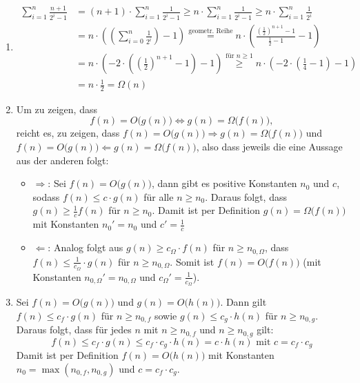 \documentclass[11pt,a4paper]{article}
\begin{document}
\begin{loesung}
\begin{enumerate}
    \item
    \begin{align}
        \sum\limits_{i=1}^{n} \frac{n + 1}{2^i - 1} &= (n+1)\cdot\sum\limits_{i=1}^{n} \frac{1}{2^i - 1} \geq
        n\cdot\sum\limits_{i=1}^{n} \frac{1}{2^i - 1} 
        \geq n \cdot \sum\limits_{i=1}^{n} \frac{1}{2^i} \\
        &= n \cdot \left(\left(\sum\limits_{i=0}^{n} \frac{1}{2^i}\right) - 1\right)
        \overset{\text{geometr. Reihe}}{=}
        n \cdot  \left(\frac{\left(\frac{1}{2}\right)^{n+1} - 1}{\frac{1}{2} - 1} - 1\right) \\
        &=n \cdot  \left(-2 \cdot \left(\left(\frac{1}{2}\right)^{n + 1} - 1\right) - 1\right)
        \overset{\text{für }n \geq 1}{\geq} n \cdot  \left(-2 \cdot \left(\frac{1}{4} - 1\right) - 1\right) \\
        &= n \cdot \frac{1}{2}= \Omega(n)
    \end{align}

    \item
    Um zu zeigen, dass 
    \begin{equation}
     f(n) = O\big(g(n)\big) \Leftrightarrow g(n) = \Omega\big(f(n)\big),
    \end{equation}
    reicht es, zu zeigen, dass $f(n) = O\big(g(n)\big) \Rightarrow g(n) = \Omega\big(f(n)\big)$ und $f(n) = O\big(g(n)\big) \Leftarrow g(n) = \Omega\big(f(n)\big)$, also dass jeweils die eine Aussage aus der anderen folgt:
    \begin{itemize}
        \item $\Rightarrow$: Sei $f(n) = O\big(g(n)\big)$, dann gibt es positive Konstanten $n_0$ und $c$, sodass $f(n) \leq c \cdot g(n)$ für alle $n \geq n_0$.
        Daraus folgt, dass $g(n) \geq \frac{1}{c} f(n)$ für $n \geq n_0$.
        Damit ist per Definition $g(n) = \Omega\big(f(n)\big)$ mit Konstanten $n_0' = n_0$ und $c' = \frac{1}{c}$
        \item $\Leftarrow$: Analog folgt aus $g(n) \geq c_\Omega \cdot f(n)$ für $n \geq n_{0,\Omega}$, dass $f(n) \leq \frac{1}{c_\Omega} \cdot g(n)$ für $n \geq n_{0,\Omega}$.
        Somit ist $f(n) = O\big(f(n)\big)$ (mit Konstanten $n_{0,\Omega}' = n_{0,\Omega}$ und $c_{\Omega}' = \frac{1}{c_\Omega}$).
    \end{itemize}

    \item
    Sei $f(n) = O\big(g(n)\big)$ und $g(n) = O\big(h(n)\big)$.
    Dann gilt $f(n) \leq c_f \cdot g(n)$ für $n \geq n_{0,f}$ sowie $g(n) \leq c_g \cdot h(n)$ für $n \geq n_{0,g}$.
    Daraus folgt, dass für jedes $n$ mit $n \geq n_{0,f}$ und $n \geq n_{0,g}$ gilt:
    \begin{equation}
        f(n) \leq c_f \cdot g(n) \leq c_f \cdot c_g \cdot h(n)
        =c\cdot h(n)\text{ mit }c=c_{f}\cdot c_{g}
    \end{equation}
    Damit ist per Definition $f(n) = O\big(h(n)\big)$ mit Konstanten $n_0 = \max(n_{0,f}, n_{0,g})$ und $c = c_f \cdot c_g$.

    


\end{enumerate}
\end{loesung}
\end{document}

